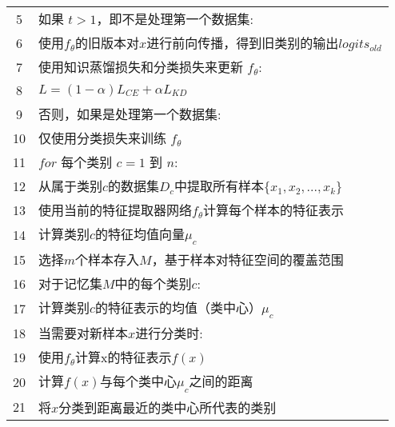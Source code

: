 \begin{table}[htbp]
\begin{tabularx}{1.0\textwidth}{cl}
		5  & \quad\quad 如果 $t > 1$，即不是处理第一个数据集:                                                          \\
		6  & \quad\quad\quad\quad 使用$f_{\theta}$的旧版本对$x$进行前向传播，得到旧类别的输出$logits_{old}$            \\
		7  & \quad\quad\quad\quad 使用知识蒸馏损失和分类损失来更新 $f_{\theta}$:                                       \\
		8  & \quad\quad\quad\quad\quad\quad $L = (1 - \alpha) L_{CE} + \alpha L_{KD}$                                  \\ %
		9  & \quad\quad 否则，如果是处理第一个数据集:                                                                  \\
		10 & \quad\quad\quad\quad 仅使用分类损失来训练 $f_{\theta}$                                                    \\
		11 & \quad\quad $for$ 每个类别 $c=1$ 到 $n$:                                                                   \\
		12 & \quad\quad\quad\quad 从属于类别$c$的数据集$D_c$中提取所有样本$\{x_1, x_2, ..., x_k\}$                     \\
		13 & \quad\quad\quad\quad 使用当前的特征提取器网络$f_{\theta}$计算每个样本的特征表示                           \\
		14 & \quad\quad\quad\quad 计算类别$c$的特征均值向量$\mu_c$                                                     \\
		15 & \quad\quad\quad\quad 选择$m$个样本存入$M$，基于样本对特征空间的覆盖范围                                   \\
		16 & \quad\quad 对于记忆集$M$中的每个类别$c$:                                                                  \\
		17 & \quad\quad\quad\quad 计算类别$c$的特征表示的均值（类中心）$\mu_c$                                         \\
		18 & \quad\quad 当需要对新样本$x$进行分类时:                                                                   \\
		19 & \quad\quad\quad\quad 使用$f_{\theta}$计算x的特征表示$f(x)$                                                \\
		20 & \quad\quad\quad\quad 计算$f(x)$与每个类中心$\mu_c$之间的距离                                              \\
		21 & \quad\quad\quad\quad 将$x$分类到距离最近的类中心所代表的类别                                              \\
		\bottomrule
	\end{tabularx}
\end{table}

